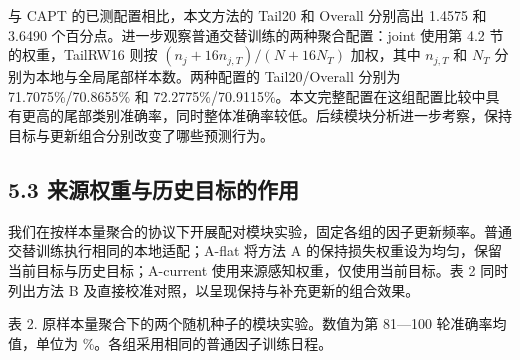 \documentclass[UTF8,a4paper,10pt,fontset=fandol]{ctexart}
\begin{document}
与 CAPT 的已测配置相比，本文方法的 Tail20 和 Overall 分别高出 1.4575 和 3.6490 个百分点。进一步观察普通交替训练的两种聚合配置：joint 使用第 4.2 节的权重，TailRW16 则按 $(n_j+16n_{j,T})/(N+16N_T)$ 加权，其中 $n_{j,T}$ 和 $N_T$ 分别为本地与全局尾部样本数。两种配置的 Tail20/Overall 分别为 71.7075\%/70.8655\% 和 72.2775\%/70.9115\%。本文完整配置在这组配置比较中具有更高的尾部类别准确率，同时整体准确率较低。后续模块分析进一步考察，保持目标与更新组合分别改变了哪些预测行为。


\subsection*{5.3 来源权重与历史目标的作用}

我们在按样本量聚合的协议下开展配对模块实验，固定各组的因子更新频率。普通交替训练执行相同的本地适配；A-flat 将方法 A 的保持损失权重设为均匀，保留当前目标与历史目标；A-current 使用来源感知权重，仅使用当前目标。表 2 同时列出方法 B 及直接校准对照，以呈现保持与补充更新的组合效果。


\noindent\begin{minipage}{\linewidth}{\small 表 2. 原样本量聚合下的两个随机种子的模块实验。数值为第 81—100 轮准确率均值，单位为 \%。各组采用相同的普通因子训练日程。\par}\medskip

\end{minipage}\par
\end{document}

